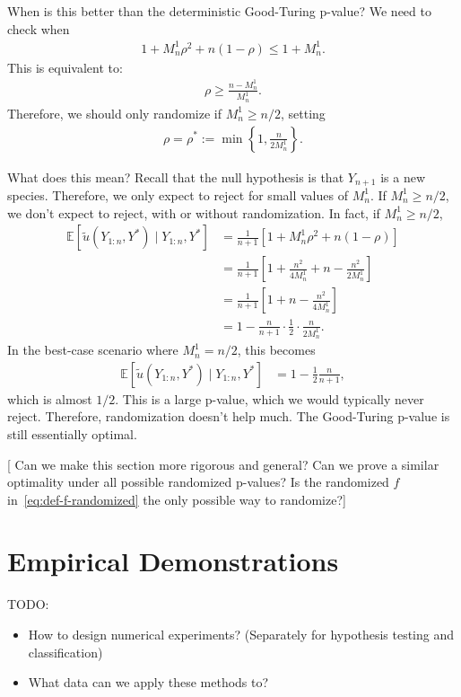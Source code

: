 \documentclass[11pt]{article}
\newcommand{\E}[1]{\mathbb{E}\left[#1\right]}
\begin{document}
When is this better than the deterministic Good-Turing p-value? We need to check when
 \begin{align*}
   1 + M_n^1 \rho^2 + n(1-\rho) \leq 1 + M_n^1.
 \end{align*}
This is equivalent to:
 \begin{align*}
   \rho \geq \frac{n-M_n^1}{M_n^1}.
 \end{align*}
Therefore, we should only randomize if $M_n^1 \geq n/2$, setting
 \begin{align*}
   \rho = \rho^* := \min \left\{ 1, \frac{n}{2M_n^1} \right\}.
 \end{align*}

What does this mean? Recall that the null hypothesis is that $Y_{n+1}$ is a new species.
Therefore, we only expect to reject for small values of $M_n^1$. If $M_n^1 \geq n/2$, we don't expect to reject, with or without randomization. 
In fact, if $M_n^1 \geq n/2$,
 \begin{align*}
   \E{\tilde{u}(Y_{1:n}, Y^*) \mid Y_{1:n}, Y^*}
   & = \frac{1}{n+1} \left[ 1 + M_n^1 \rho^2 + n(1-\rho) \right] \\
   & = \frac{1}{n+1} \left[ 1 + \frac{n^2}{4M_n^1} + n - \frac{n^2}{2M_n^1} \right] \\
   & = \frac{1}{n+1} \left[ 1 + n -  \frac{n^2}{4M_n^1}  \right] \\
   & = 1 - \frac{n}{n+1} \cdot \frac{1}{2} \cdot \frac{n}{2M_n^1}.
 \end{align*}
 In the best-case scenario where $M_n^1 = n/2$, this becomes 
 \begin{align*}
   \E{\tilde{u}(Y_{1:n}, Y^*) \mid Y_{1:n}, Y^*}
   & = 1 - \frac{1}{2} \frac{n}{n+1},
 \end{align*}
which is almost $1/2$. This is a large p-value, which we would typically never reject. Therefore, randomization doesn't help much. The Good-Turing p-value is still essentially optimal.

{\color{red}[ Can we make this section more rigorous and general? Can we prove a similar optimality under all possible randomized p-values? Is the randomized $f$ in~\eqref{eq:def-f-randomized} the only possible way to randomize?]}


\section{Empirical Demonstrations}

{\color{red} TODO:
\begin{itemize}
    \item How to design numerical experiments? (Separately for hypothesis testing and classification)
    \item What data can we apply these methods to?
\end{itemize}
}
\end{document}
